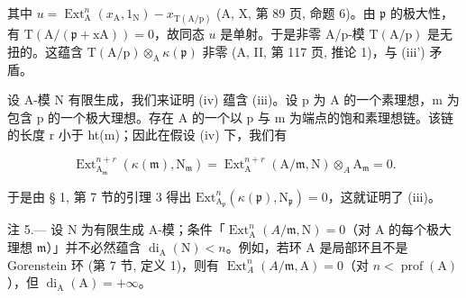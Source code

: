 其中 \(u = \operatorname{Ext}_{\mathrm{A}}^{n}(x_{\mathrm{A}}, 1_{\mathrm{N}}) - x_{\mathrm{T(A/p)}}\) (A, X, 第 89 页, 命题 6)。由 \(\mathfrak{p}\) 的极大性，有 \(\mathrm{T(A / (\mathfrak{p} + xA))} = 0\)，故同态 \(u\) 是单射。于是非零 A/p-模 \(\mathrm{T(A/p)}\) 是无扭的。这蕴含 \(\mathrm{T(A/p)} \otimes_{\mathrm{A}} \kappa(\mathfrak{p})\) 非零 (A, II, 第 117 页, 推论 1)，与 (iii') 矛盾。

设 A-模 N 有限生成，我们来证明 (iv) 蕴含 (iii)。设 p 为 A 的一个素理想，m 为包含 p 的一个极大理想。存在 A 的一个以 p 与 m 为端点的饱和素理想链。该链的长度 r 小于 ht(m)；因此在假设 (iv) 下，我们有

\[
\operatorname{Ext} _ {\mathrm{A} _ {\mathfrak {m}}} ^ {n + r} (\kappa (\mathfrak {m}), \mathrm{N} _ {\mathfrak {m}}) = \operatorname{Ext} _ {\mathrm{A}} ^ {n + r} (\mathrm{A} / \mathfrak {m}, \mathrm{N}) \otimes_ {A} \mathrm{A} _ {\mathfrak {m}} = 0.
\]

于是由 § 1, 第 7 节的引理 3 得出 \(\mathrm{Ext}_{\mathrm{A}_{\mathfrak{p}}}^{n}(\kappa(\mathfrak{p}),\mathrm{N}_{\mathfrak{p}})=0\)，这就证明了 (iii)。

注 5.— 设 N 为有限生成 A-模；条件「\(\operatorname{Ext}_{\mathrm{A}}^{n}(A/\mathfrak{m},\mathrm{N})=0\)（对 A 的每个极大理想 \(\mathfrak{m}\)）」并不必然蕴含 \(\operatorname{di}_{\mathrm{A}}(\mathrm{N})<n\)。例如，若环 A 是局部环且不是 Gorenstein 环 (第 7 节, 定义 1)，则有 \(\operatorname{Ext}_{A}^{n}(A/\mathfrak{m},\mathrm{A})=0\)（对 \(n<\operatorname{prof}(\mathrm{A})\)），但 \(\operatorname{di}_{\mathrm{A}}(\mathrm{A})=+\infty\)。

